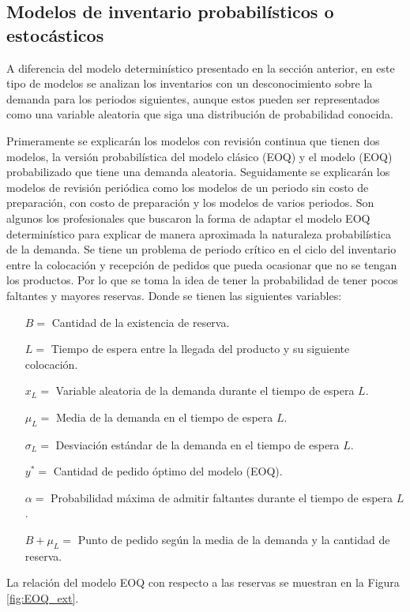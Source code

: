 \subsection{Modelos de inventario probabilísticos o estocásticos}
A diferencia del modelo determinístico presentado en la sección anterior, en este tipo de modelos se analizan los inventarios con un desconocimiento sobre la demanda para los periodos siguientes, aunque estos pueden ser representados como una variable aleatoria que siga una distribución de probabilidad conocida. \citep{taha2012investigacion}

Primeramente se explicarán los modelos con revisión continua que tienen dos modelos, la versión probabilística del modelo clásico (EOQ) y el modelo (EOQ) probabilizado que tiene una demanda aleatoria. Seguidamente se explicarán los modelos de revisión periódica como los modelos de un periodo sin costo de preparación, con costo de preparación y los modelos de varios periodos. 
\label{EOQ_probabilizado}
Son algunos los profesionales que buscaron la forma de adaptar el modelo EOQ determinístico para explicar de manera aproximada la naturaleza probabilística de la demanda. Se tiene un problema de periodo crítico en el ciclo del inventario entre la colocación y recepción de pedidos que pueda ocasionar que no se tengan los productos. Por lo que se toma la idea de tener la probabilidad de tener pocos faltantes y mayores reservas. Donde se tienen las siguientes variables:
\begin{itemize}
	\item[$B=$] Cantidad de la existencia de reserva.
	\item[$L=$] Tiempo de espera entre la llegada del producto y su siguiente colocación.
	\item[${x}_{L}=$] Variable aleatoria de la demanda durante el tiempo de espera $L$.
	\item[${\mu}_{L}=$] Media de la demanda en el tiempo de espera $L$.
	\item[${\sigma}_{L}=$] Desviación estándar de la demanda en el tiempo de espera $L$.
	\item[${y}^{*}=$] Cantidad de pedido óptimo del modelo (EOQ).
	\item[$\alpha =$] Probabilidad máxima de admitir faltantes durante el tiempo de espera $L$.
	\item[$B + {\mu}_{L} =$] Punto de pedido según la media de la demanda y la cantidad de reserva.
\end{itemize}
La relación del modelo EOQ con respecto a las reservas se muestran en la Figura \ref{fig:EOQ_ext}.

